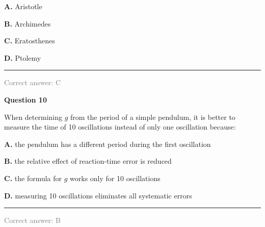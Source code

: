 \documentclass[11pt,a4paper]{article}
\newcommand{\answernote}[1]{%
\vfill
\noindent\textcolor{gray}{\rule{\linewidth}{0.4pt}}

{\small\textcolor{gray}{Correct answer: #1}}
}
\begin{document}
\vspace{0.5em}

{\large
\textbf{A.} Aristotle

\textbf{B.} Archimedes

\textbf{C.} Eratosthenes

\textbf{D.} Ptolemy
}

\answernote{C}
\newpage

{\LARGE\textbf{Question 10}}

When determining $g$ from the period of a simple pendulum, it is better to measure the time of 10 oscillations instead of only one oscillation because:

\vspace{0.5em}

{\large
\textbf{A.} the pendulum has a different period during the first oscillation

\textbf{B.} the relative effect of reaction-time error is reduced

\textbf{C.} the formula for $g$ works only for 10 oscillations

\textbf{D.} measuring 10 oscillations eliminates all systematic errors
}

\answernote{B}
\end{document}
